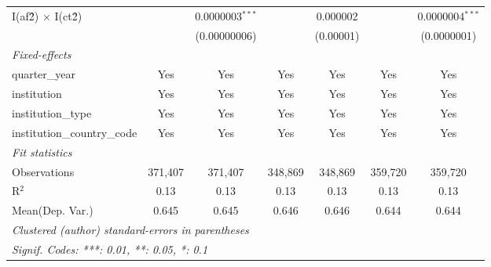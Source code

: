 \begin{tabular}{lcccccc}
   I(af\^2) $\times$ I(ct\^2)         &               & 0.0000003$^{***}$ &               & 0.000002        &               & 0.0000004$^{***}$\\   
                                      &               & (0.00000006)      &               & (0.00001)       &               & (0.0000001)\\   
   \midrule
   \emph{Fixed-effects}\\
   quarter\_year                      & Yes           & Yes               & Yes           & Yes             & Yes           & Yes\\  
   institution                        & Yes           & Yes               & Yes           & Yes             & Yes           & Yes\\  
   institution\_type                  & Yes           & Yes               & Yes           & Yes             & Yes           & Yes\\  
   institution\_country\_code         & Yes           & Yes               & Yes           & Yes             & Yes           & Yes\\  
   \midrule
   \emph{Fit statistics}\\
   Observations                       & 371,407       & 371,407           & 348,869       & 348,869         & 359,720       & 359,720\\  
   R$^2$                              & 0.13          & 0.13              & 0.13          & 0.13            & 0.13          & 0.13\\  
Mean(Dep. Var.) & 0.645 & 0.645 & 0.646 & 0.646 & 0.644 & 0.644 \\
   \midrule \midrule
   \multicolumn{7}{l}{\emph{Clustered (author) standard-errors in parentheses}}\\
   \multicolumn{7}{l}{\emph{Signif. Codes: ***: 0.01, **: 0.05, *: 0.1}}\\
\end{tabular}
\par\endgroup
